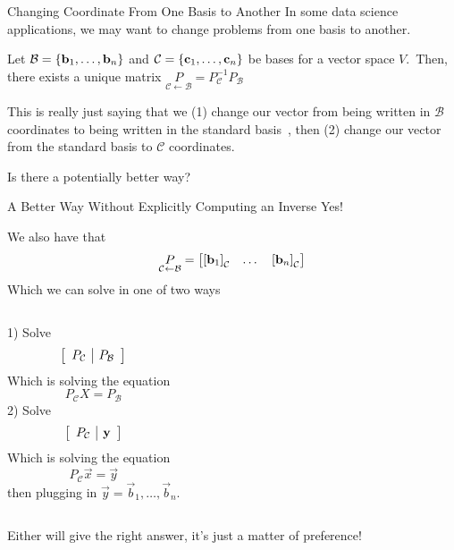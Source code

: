 \documentclass[xcoler=dvipsnames, aspectratio=169]{beamer}
\newcommand{\B}{\mathcal{B}}
\newcommand{\C}{\mathcal{C}}
\begin{document}
    \begin{frame}{Changing Coordinate From One Basis to Another}
        In some data science applications, we may want to change problems from one basis to another.
        \pause
        \begin{theorem}
            Let $\B=\setBasic{\vec{b}_1, \dots, \vec{b}_n}$ and $\C=\setBasic{\vec{c}_1,\dots,\vec{c}_n}$
            be bases for a vector space $V$.\pause\ Then, there exists a unique matrix 
            $\underset{\C\leftarrow\B}{P}=P^{-1}_\C P_\B$
        \end{theorem}\pause
        
        This is really just saying that we (1) change our vector from being written in $\B$ coordinates
        to being written in the standard basis\pause\ , then (2) change our vector from the standard
        basis to $\C$ coordinates.\pause\ 

        Is there a potentially better way?
    \end{frame}
    \begin{frame}{A Better Way Without Explicitly Computing an Inverse}
        Yes!\pause\ 

        We also have that 
        \[
            \underset{\C\leftarrow\B}{P}=\bMat{\bCoord{\vec{b}_1}{\C} & \dots &\bCoord{\vec{b}_n}{\C}}
        \]\pause
        Which we can solve in one of two ways
        \begin{columns}
                1) Solve
                \[
                    \aMat{c|c}{
                        P_\C & P_\B
                    }
                \]\pause
                Which is solving the equation
                \[
                    P_\C X = P_\B
                \]\pause
                2) Solve
                \[
                    \aMat{c|c}{
                        P_\C & \vec{y}
                    }
                \]\pause
                Which is solving the equation
                \[
                    P_\C\vec{x} = \vec{y}
                \]
                then plugging in $\vec{y} = \vec{b}_1,\dots,\vec{b}_n$.\pause
        \end{columns}
        Either will give the right answer, it's just a matter of preference!
    \end{frame}
\end{document}
